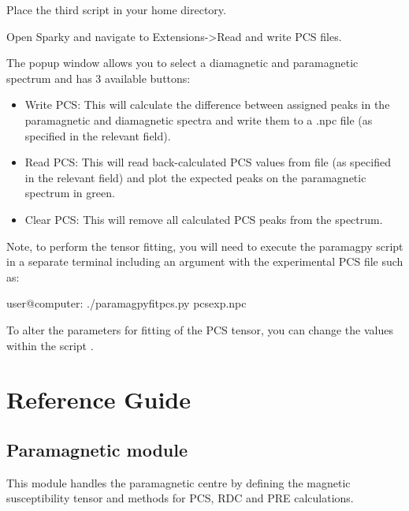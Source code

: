 \documentclass[a4paper,10pt,english]{sphinxmanual}
\begin{document}
Place the third script  in your home directory.

Open Sparky and navigate to Extensions-\textgreater{}Read and write PCS files.

\noindent{}

The popup window allows you to select a diamagnetic and paramagnetic spectrum and has 3 available buttons:
\begin{itemize}
\item {} 
Write PCS: This will calculate the difference between assigned peaks in the paramagnetic and diamagnetic spectra and write them to a .npc file (as specified in the relevant field).

\item {} 
Read PCS: This will read back-calculated PCS values from file (as specified in the relevant field) and plot the expected peaks on the paramagnetic spectrum in green.

\item {} 
Clear PCS: This will remove all calculated PCS peaks from the spectrum.

\end{itemize}

Note, to perform the tensor fitting, you will need to execute the paramagpy script in a separate terminal including an argument with the experimental PCS file such as:

%
\begin{sphinxVerbatim}[commandchars=\\\{\}]
user@computer:\PYGZti{}\PYGZdl{} ./paramagpy\PYGZus{}fit\PYGZus{}pcs.py pcsexp.npc
\end{sphinxVerbatim}

To alter the parameters for fitting of the PCS tensor, you can change the values within the script .


\section{Reference Guide}
\label{\detokenize{reference/index:reference-guide}}\label{\detokenize{reference/index:reference-index}}\label{\detokenize{reference/index::doc}}

\subsection{Paramagnetic module}
\label{\detokenize{reference/index:paramagnetic-module}}
This module handles the paramagnetic centre by defining the magnetic susceptibility
tensor and methods for PCS, RDC and PRE calculations.
\end{document}
